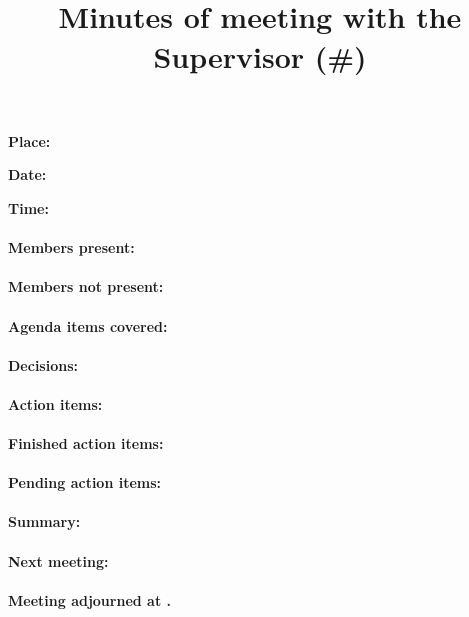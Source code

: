 \documentclass[paper=a4, fontsize=11pt]{article} %
\title{
\horrule{0.5pt} \\[0.4cm] %
\huge Minutes of meeting with the Supervisor (\#\meetingNumber)
\horrule{2pt} \\[-0.9cm] %
}
\newcounter{foocounter}
\begin{document}
\date{}
\maketitle %

\textbf{Place:} \meetingPlace

\textbf{Date:}  \meetingDate

\textbf{Time:}  \meetingTime

\paragraph{Members present:} \membersPresent

\paragraph{Members not present:} \membersMissing

\paragraph{Agenda items covered:} \hspace{0pt}
\setcounter{foocounter}{0}

\paragraph{Decisions:} \hspace{0pt}
\setcounter{foocounter}{0}

\paragraph{Action items:} \hspace{0pt}
\setcounter{foocounter}{0}

\paragraph{Finished action items:} \hspace{0pt}
\setcounter{foocounter}{0}

\paragraph{Pending action items:} \hspace{0pt}
\setcounter{foocounter}{0}


\paragraph{Summary:} \summary

\paragraph{Next meeting:} \nextMeeting

\paragraph{Meeting adjourned at \meetingEnd.}
\end{document}

